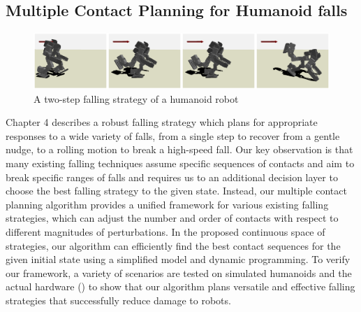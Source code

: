 \subsection{Multiple Contact Planning for Humanoid falls}
\begin{figure}[h]
  \begin{center}
    \includegraphics[width=1.0\textwidth]{images/intro_gp_tripod}
  \end{center}
  \caption{A two-step falling strategy of a humanoid robot}
  \label{fig:intro_hardware}
\end{figure}
Chapter 4 describes a robust falling strategy which plans for appropriate 
responses to a wide variety of falls, from a single step to recover
from a gentle nudge, to a rolling motion to break a high-speed fall.
Our key observation is that many existing falling techniques
\cite{Wang:2012:WTO,Yun:2014:TFC,ZenpoUkemi:2014:URL}
assume specific sequences of contacts and aim to break specific ranges of
falls and requires us to an additional decision layer to choose the best
falling strategy to the given state.
Instead, our multiple contact planning algorithm provides a unified framework
for various existing falling strategies, which can adjust the number and order
of contacts with respect to different magnitudes of perturbations.
In the proposed continuous space of strategies, our algorithm can efficiently
find the best contact sequences for the given initial state using a
simplified model and dynamic programming.
To verify our framework, a variety of scenarios are tested on simulated
humanoids and the actual hardware () to show that our
algorithm plans versatile and effective falling strategies
that successfully reduce damage to robots.

